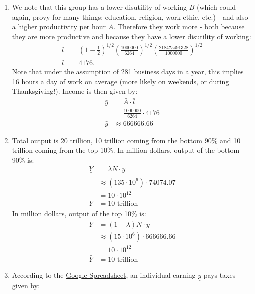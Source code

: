 \documentclass[]{book}
\begin{document}
\begin{enumerate}
\def\labelenumi{\arabic{enumi}.}
\setcounter{enumi}{4}
\item
  We note that this group has a lower disutility of working \(B\) (which
  could again, provy for many things: education, religion, work ethic,
  etc.) - and also a higher productivity per hour \(A\). Therefore they
  work more - both because they are more productive and because they
  have a lower disutility of working: \[
  \begin{aligned}
  \bar{l}&=\left(1-\frac{1}{2}\right)^{1/2}\left(\frac{1000000}{6264}\right)^{1/2}\left(\frac{218475491328}{1000000}\right)^{1/2}\\
  \bar{l}&=4176.
  \end{aligned}
  \] Note that under the assumption of 281 business days in a year, this
  implies 16 hours a day of work on average (more likely on weekends, or
  during Thanksgiving!). Income is then given by: \[
  \begin{aligned}
  \bar{y}&=\bar{A} \cdot \bar{l}\\
  &=\frac{1000000}{6264}\cdot 4176\\
  \bar{y}&\approx666666.66
  \end{aligned}
  \]
\item
  Total output is 20 trillion, 10 trillion coming from the bottom 90\%
  and 10 trillion coming from the top 10\%. In million dollars, output
  of the bottom 90\% is: \[
  \begin{aligned}
  \underline{Y} &= \lambda N \cdot \underline{y}\\
  &\approx (135 \cdot 10^6) \cdot 74074.07\\
  &= 10 \cdot 10^{12}\\
  \underline{Y} &= 10 \text{ trillion}
  \end{aligned}
  \] In million dollars, output of the top 10\% is: \[
  \begin{aligned}
  \bar{Y} &= (1-\lambda) N \cdot \bar{y}\\
  &\approx (15 \cdot 10^6) \cdot 666666.66\\
  &= 10 \cdot 10^{12}\\
  \bar{Y} &= 10 \text{ trillion}
  \end{aligned}
  \]
\item
  According to the
  \href{https://docs.google.com/spreadsheets/d/1faC3VTuXmo7wo4njkO2ERytzlJmbMgcckVj9ag_Mn6s/edit?usp=sharing}{Google
  Spreadsheet}, an individual earning \(\underline{y}\) pays taxes given
  by: \[
  \begin{aligned}

\end{aligned}\]
\end{enumerate}
\end{document}
